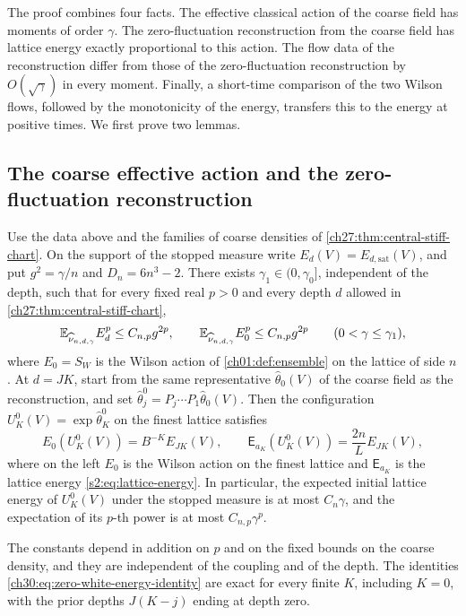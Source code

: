 The proof combines four facts. The effective classical action of the coarse field has moments of order $\gamma$. The zero-fluctuation reconstruction from the coarse field has lattice energy exactly proportional to this action. The flow data of the reconstruction differ from those of the zero-fluctuation reconstruction by $O(\sqrt\gamma)$ in every moment. Finally, a short-time comparison of the two Wilson flows, followed by the monotonicity of the energy, transfers this to the energy at positive times. We first prove two lemmas.

\subsection{The coarse effective action and the zero-fluctuation reconstruction}

\begin{lemma}\label{ch30:lem:terminal-energy-and-skeleton}
Use the data above and the families of coarse densities of \cref{ch27:thm:central-stiff-chart}. On the support of the stopped measure write $E_d(V)=E_{d,\mathrm{sat}}(V)$, and put $g^2=\gamma/n$ and $D_n=6n^3-2$. There exists $\gamma_1\in(0,\gamma_0]$, independent of the depth, such that for every fixed real $p>0$ and every depth $d$ allowed in \cref{ch27:thm:central-stiff-chart},
\[
 \mathbb E_{\widehat\nu_{n,d,\gamma}}E_d^p\le C_{n,p}g^{2p},\qquad\mathbb E_{\widehat\nu_{n,d,\gamma}}E_0^p\le C_{n,p}g^{2p}\qquad(0<\gamma\le\gamma_1),
\]
where $E_0=S_W$ is the Wilson action of \cref{ch01:def:ensemble} on the lattice of side $n$. At $d=JK$, start from the same representative $\widehat\theta_0(V)$ of the coarse field as the reconstruction, and set $\widehat\theta_j^0=P_j\cdots P_1\widehat\theta_0(V)$. Then the configuration $U_K^0(V)=\exp\widehat\theta_K^0$ on the finest lattice satisfies
\begin{equation}\label{ch30:eq:zero-white-energy-identity}
 E_0(U_K^0(V))=B^{-K}E_{JK}(V),\qquad\mathsf E_{a_K}(U_K^0(V))=\frac{2n}{L}E_{JK}(V),
\end{equation}
where on the left $E_0$ is the Wilson action on the finest lattice and $\mathsf E_{a_K}$ is the lattice energy \eqref{s2:eq:lattice-energy}. In particular, the expected initial lattice energy of $U_K^0(V)$ under the stopped measure is at most $C_n\gamma$, and the expectation of its $p$-th power is at most $C_{n,p}\gamma^p$.
\end{lemma}

The constants depend in addition on $p$ and on the fixed bounds on the coarse density, and they are independent of the coupling and of the depth. The identities \eqref{ch30:eq:zero-white-energy-identity} are exact for every finite $K$, including $K=0$, with the prior depths $J(K-j)$ ending at depth zero.

